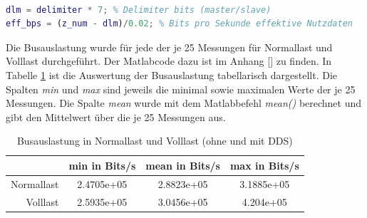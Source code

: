 \begin{lstlisting}[language=Matlab]
% --- Auswertung

dlm = delimiter * 7; % Delimiter bits (master/slave)
eff_bps = (z_num - dlm)/0.02; % Bits pro Sekunde effektive Nutzdaten

\end{lstlisting}

Die Busauslastung wurde für jede der je 25 Messungen für Normallast und Volllast durchgeführt. Der Matlabcode dazu ist im Anhang \ref{} zu finden. In Tabelle \ref{tab:Busauslastung} ist die Auswertung  der Busauslastung tabellarisch dargestellt. Die Spalten \textit{min} und \textit{max} sind jeweils die minimal sowie maximalen Werte der je 25 Messungen. Die Spalte \textit{mean} wurde mit dem Matlabbefehl \textit{mean()} berechnet und gibt den Mittelwert über die je 25 Messungen aus. 

\begin{table}[H]
    \centering
    \begin{tabular}{r|c|c|c}
        & min in Bits/s & mean in Bits/s & max in Bits/s\\ 
        \hline
        Normallast & 2.4705e+05 & 2.8823e+05 & 3.1885e+05\\
        \hline
        Volllast & 2.5935e+05 & 3.0456e+05 & 4.204e+05 \\
    \end{tabular}
    \caption{Busauslastung in Normallast und Volllast (ohne und mit DDS) }
    \label{tab:Busauslastung}
\end{table}
